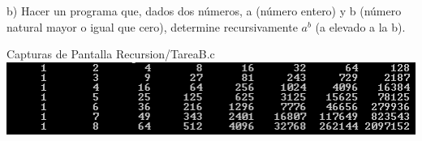 b) Hacer un programa que, dados dos números, a (número entero)
y b (número natural mayor o igual que cero), determine
recursivamente $a^b$ (a elevado a la b).

Capturas de Pantalla Recursion/TareaB.c
\newline
\includegraphics{Recursion/img/TareaB_1.png}
